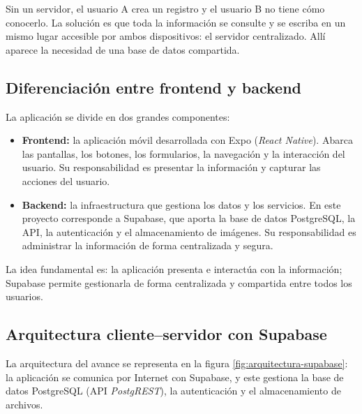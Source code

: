 Sin un servidor, el usuario A crea un registro y el usuario B no tiene c\'omo
conocerlo. La soluci\'on es que toda la informaci\'on se consulte y se
escriba en un mismo lugar accesible por ambos dispositivos: el servidor
centralizado. All\'i aparece la necesidad de una base de datos compartida.

\subsection{Diferenciaci\'on entre frontend y backend}

La aplicaci\'on se divide en dos grandes componentes:

\begin{itemize}
  \item \textbf{Frontend:} la aplicaci\'on m\'ovil desarrollada con Expo
    (\textit{React Native}). Abarca las pantallas, los botones, los
    formularios, la navegaci\'on y la interacci\'on del usuario. Su
    responsabilidad es presentar la informaci\'on y capturar las acciones
    del usuario.

  \item \textbf{Backend:} la infraestructura que gestiona los datos y los
    servicios. En este proyecto corresponde a Supabase, que aporta la base
    de datos PostgreSQL, la API, la autenticaci\'on y el almacenamiento
    de im\'agenes. Su responsabilidad es administrar la informaci\'on de
    forma centralizada y segura.
\end{itemize}

La idea fundamental es: la aplicaci\'on presenta e interact\'ua con la
informaci\'on; Supabase permite gestionarla de forma centralizada y
compartida entre todos los usuarios.

\subsection{Arquitectura cliente--servidor con Supabase}

La arquitectura del avance se representa en la figura
\ref{fig:arquitectura-supabase}: la aplicaci\'on se comunica por Internet
con Supabase, y este gestiona la base de datos PostgreSQL (API
\textit{PostgREST}), la autenticaci\'on y el almacenamiento de archivos.

